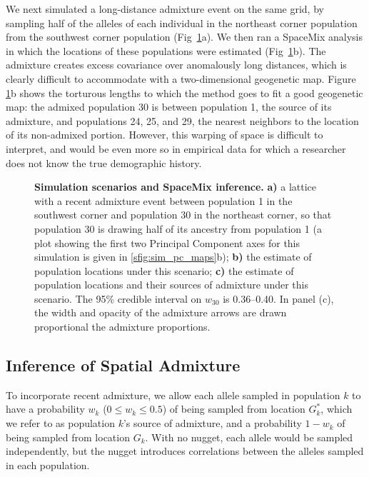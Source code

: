 \documentclass[10pt,letterpaper]{article}
\newcommand{\kadmixsource}[1]{{$G^{*}_{#1}$}}
\begin{document}
We next simulated a long-distance admixture event on the same grid,
by sampling half of the alleles of each individual in the northeast corner population from the southwest corner population (Fig\ \ref{sfig:corner_admix_scenarios}a).  We then ran a SpaceMix analysis in which the locations of these populations were estimated (Fig\ \ref{sfig:corner_admix_scenarios}b).
The admixture creates excess covariance over anomalously long distances, which is clearly difficult to accommodate with a two-dimensional geogenetic map.
Figure \ref{sfig:corner_admix_scenarios}b shows the torturous lengths to which the method goes to fit a good geogenetic map: the admixed population 30 is between population 1, the source of its admixture, and populations 24, 25, and 29, the nearest neighbors to the location of its non-admixed portion.
However, this warping of space is difficult to interpret, and would be even more so in empirical data for which a researcher does not know the true demographic history.  
%
\begin{figure}[ht!]
\begin{center}
\end{center}
\caption{
\textbf{Simulation scenarios and SpaceMix inference.}  
	\textbf{a)} 
	a lattice with a recent admixture event between population 1 in the southwest corner and population 30 in the northeast corner, so that population 30 is drawing half of its ancestry from population 1 (a plot showing the first two Principal Component axes for this simulation is given in \ref{sfig:sim_pc_maps}b); 
	\textbf{b)} 
	the estimate of population locations under this scenario; 
	\textbf{c)}
	the estimate of population locations and their sources of admixture under this scenario.  The 95\% credible interval on $w_{30}$ is 0.36--0.40. In panel (c), the width and opacity of the admixture arrows are drawn proportional the admixture proportions.}\label{sfig:corner_admix_scenarios}
\end{figure}


\subsection*{Inference of Spatial Admixture}

To incorporate recent admixture, 
we allow each allele sampled in population $k$ to have a probability $w_k$ ($0 \leq w_k \leq 0.5$) of being sampled from location \kadmixsource{k},
which we refer to as population $k$'s source of admixture,
and a probability $1-w_k$ of being sampled from location $G_k$.
With no nugget, each allele would be sampled independently, but the nugget introduces correlations between the alleles sampled in each population.
\end{document}
